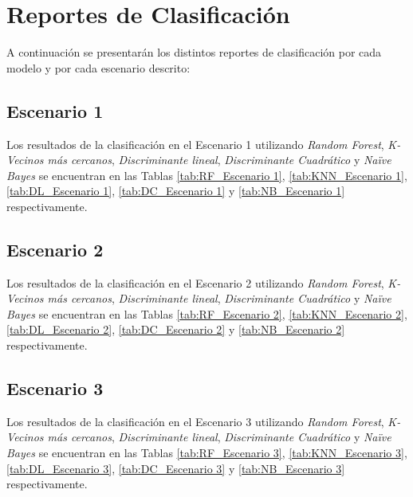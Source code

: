 \appendices
\section{Reportes de Clasificación}\label{append:rep-clasf}
A continuación se presentarán los distintos reportes de clasificación por cada modelo y por cada escenario descrito:
\subsection{Escenario 1}\label{append:escn1}
Los resultados de la clasificación en el Escenario 1 utilizando \textit{Random Forest}, \textit{K-Vecinos más cercanos}, \textit{Discriminante lineal}, \textit{Discriminante Cuadrático} y \textit{Naïve Bayes} se encuentran en las Tablas \ref{tab:RF_Escenario 1}, \ref{tab:KNN_Escenario 1}, \ref{tab:DL_Escenario 1}, \ref{tab:DC_Escenario 1} y \ref{tab:NB_Escenario 1} respectivamente. 

\subsection{Escenario 2}\label{append:escn2}
Los resultados de la clasificación en el Escenario 2 utilizando \textit{Random Forest}, \textit{K-Vecinos más cercanos}, \textit{Discriminante lineal}, \textit{Discriminante Cuadrático} y \textit{Naïve Bayes} se encuentran en las Tablas \ref{tab:RF_Escenario 2}, \ref{tab:KNN_Escenario 2}, \ref{tab:DL_Escenario 2}, \ref{tab:DC_Escenario 2} y \ref{tab:NB_Escenario 2} respectivamente. 

\subsection{Escenario 3}\label{append:escn3}
Los resultados de la clasificación en el Escenario 3 utilizando \textit{Random Forest}, \textit{K-Vecinos más cercanos}, \textit{Discriminante lineal}, \textit{Discriminante Cuadrático} y \textit{Naïve Bayes} se encuentran en las Tablas \ref{tab:RF_Escenario 3}, \ref{tab:KNN_Escenario 3}, \ref{tab:DL_Escenario 3}, \ref{tab:DC_Escenario 3} y \ref{tab:NB_Escenario 3} respectivamente. 

\newpage












